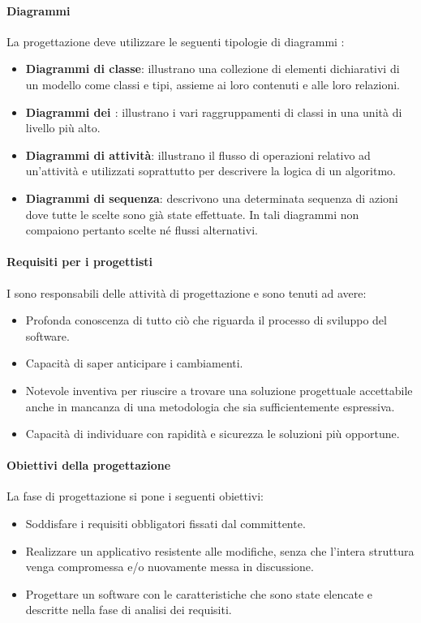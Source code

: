 \paragraph{Diagrammi}
La progettazione deve utilizzare le seguenti tipologie di diagrammi :
\begin{itemize}
\item
\textbf{Diagrammi di classe}: illustrano una collezione di elementi dichiarativi di un modello come classi e tipi, assieme ai loro contenuti e alle loro relazioni.
\item
\textbf{Diagrammi dei \textit{}}: illustrano i vari raggruppamenti di classi in una unità di livello più alto.
\item
\textbf{Diagrammi di attività}: illustrano il flusso di operazioni relativo ad un'attività e utilizzati soprattutto per descrivere la logica di un algoritmo.
\item
\textbf{Diagrammi di sequenza}: descrivono una determinata sequenza di azioni dove tutte le scelte sono già state effettuate. In tali diagrammi non compaiono pertanto scelte né flussi alternativi.
\end{itemize}

\paragraph{Requisiti per i progettisti}
I \textit{\ProgP} sono responsabili delle attività di progettazione e sono tenuti ad avere:
\begin{itemize}
\item
Profonda conoscenza di tutto ciò che riguarda il processo di sviluppo del software.
\item
Capacità di saper anticipare i cambiamenti.
\item
Notevole inventiva per riuscire a trovare una soluzione progettuale accettabile anche in mancanza di una metodologia che sia sufficientemente espressiva.
\item
Capacità di individuare con rapidità e sicurezza le soluzioni più opportune.
\end{itemize}

\paragraph{Obiettivi della progettazione}
La fase di progettazione si pone i seguenti obiettivi:
\begin{itemize}
\item Soddisfare i requisiti obbligatori fissati dal committente.
\item Realizzare un applicativo  resistente alle modifiche, senza che l'intera struttura venga compromessa e/o nuovamente messa in discussione.
\item Progettare un software con le caratteristiche che sono state elencate e descritte nella fase di analisi dei requisiti.
\end{itemize}


